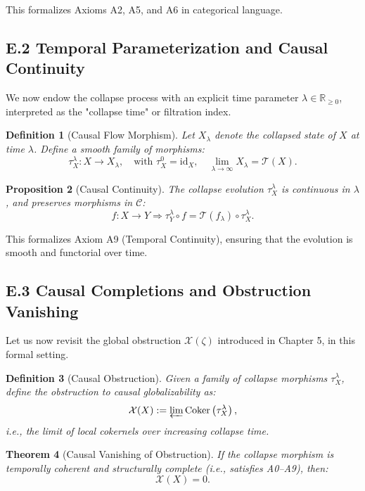 \documentclass[11pt]{article}
\newtheorem{theorem}{Theorem}[section]
\newtheorem{definition}[theorem]{Definition}
\newtheorem{proposition}[theorem]{Proposition}
\newcommand{\Sha}{\mathcal{X}}
\begin{document}
This formalizes Axioms A2, A5, and A6 in categorical language.

\subsection*{E.2 Temporal Parameterization and Causal Continuity}

We now endow the collapse process with an explicit time parameter $\lambda \in \mathbb{R}_{\geq 0}$,  
interpreted as the "collapse time" or filtration index.

\begin{definition}[Causal Flow Morphism]
Let $X_\lambda$ denote the collapsed state of $X$ at time $\lambda$.  
Define a smooth family of morphisms:
\[
\tau^\lambda_X : X \to X_\lambda, \quad \text{with } \tau^0_X = \text{id}_X, \quad \lim_{\lambda \to \infty} X_\lambda = \mathcal{T}(X).
\]
\end{definition}

\begin{proposition}[Causal Continuity]
The collapse evolution $\tau^\lambda_X$ is continuous in $\lambda$, and preserves morphisms in $\mathcal{C}$:
\[
f : X \to Y \Rightarrow \tau^\lambda_Y \circ f = \mathcal{T}(f_\lambda) \circ \tau^\lambda_X.
\]
\end{proposition}

This formalizes Axiom A9 (Temporal Continuity), ensuring that the evolution is smooth and functorial over time.

\subsection*{E.3 Causal Completions and Obstruction Vanishing}

Let us now revisit the global obstruction $\Sha(\zeta)$ introduced in Chapter 5, in this formal setting.

\begin{definition}[Causal Obstruction]
Given a family of collapse morphisms $\tau^\lambda_X$, define the obstruction to causal globalizability as:
\[
\Sha(X) := \varprojlim \mathrm{Coker}\left( \tau^\lambda_X \right),
\]
i.e., the limit of local cokernels over increasing collapse time.
\end{definition}

\begin{theorem}[Causal Vanishing of Obstruction]
If the collapse morphism is temporally coherent and structurally complete (i.e., satisfies A0–A9), then:
\[
\Sha(X) = 0.
\]
\end{theorem}
\end{document}
